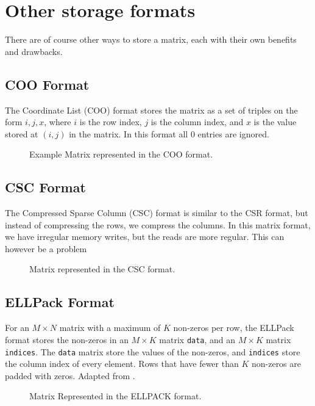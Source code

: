 \section{Other storage formats}
There are of course other ways to store a matrix, each with their own benefits and drawbacks.

\subsection{COO Format}
The Coordinate List (COO) format stores the matrix as a set of triples on the form \(i,j,x\), where \(i\) is the row index, \(j\) is the column index, and \(x\) is the value stored at \((i,j)\) in the matrix. In this format all \(0\) entries are ignored.

\begin{figure}[H]
    \centering
    \caption{Example Matrix represented in the COO format.}
    \label{fig:cooformat}
\end{figure}


\subsection{CSC Format}
The Compressed Sparse Column (CSC) format is similar to the CSR format, but instead of compressing the rows, we compress the columns. In this matrix format, we have irregular memory writes, but the reads are more regular. This can however be a problem

\begin{figure}[H]
    \centering
    \caption{Matrix represented in the CSC format.}
    \label{fig:cscformat}
\end{figure}

\subsection{ELLPack Format}
For an \(M \times  N\) matrix with a maximum of \(K\) non-zeros per row, the ELLPack format stores the non-zeros in an \(M \times  K\) matrix \texttt{data}, and an \(M \times  K\) matrix \texttt{indices}. The \texttt{data} matrix store the values of the non-zeros, and \texttt{indices} store the column index of every element. Rows that have fewer than \(K\) non-zeros are padded with zeros. Adapted from \cite{ellpackformat}.

\begin{figure}[ht]
    \centering
    \caption{Matrix Represented in the ELLPACK format.}
    \label{fig:ellpackformat}
\end{figure}


